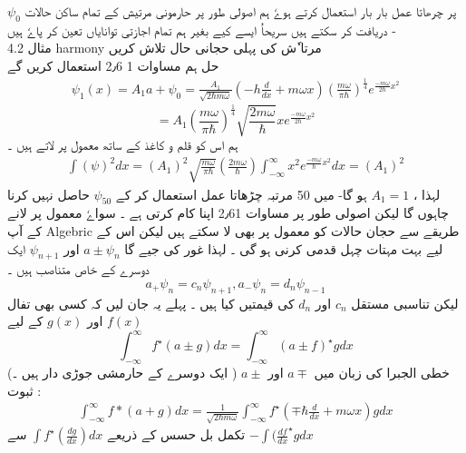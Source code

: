 $ \psi_0 $
پر چرھاتا عمل بار بار استعمال کرتے ہوےٗ ہم اصولی طور پر حارمونی مرتیش کے تمام ساکن حالات دریافت کر سکتے ہیں 
\newpage 
سریحاُ ایسے کیے بغیر ہم تمام  اجازتی توانایاں تعین کر پاےٗ ہیں -
\\
مثال 4.2
harmony مرتا ٗش کی پہلی حجانی حال تلاش کریں 
\\
حل ہم مساوات 1 2٫6 استعمال کریں گے 
\begin{align}
\psi_1 (x) = A_1 a + \psi_0 = \frac{ A_1 }{ \sqrt{ 2 \hbar m \omega } } ( - h \frac{d}{dx} + m \omega x) ( \frac{ m \omega}{ \pi \hbar} )^\frac{1}{4}    e^{\frac{ - m \omega }{ 2 \hbar } x^2}
\end{align}
\begin{equation}
 = A_1 ( \frac{ m \omega }{ \pi \hbar})^\frac{1}{4} \sqrt{ \frac{ 2 m \omega }{ \hbar} } x e^{\frac{ - m \omega }{ 2 \hbar } x^2}
\end{equation}
ہم اس کو قلم و کاغذ کے ساتھ  معمول پر لاتے ہیں ۔ 
\begin{align}
\int{ ( \psi )^2 dx} = ( A_1 )^2 \sqrt{ \frac{ m \omega}{ \pi \hbar } } ( \frac{ 2 m \omega }{ \hbar} ) \int_{ - \infty }^{ \infty } x^2  e^{\frac{ - m \omega }{ \hbar } x^2}  dx  =  ( A_1)^2
\end{align} 
لہذا ، 
$ A_1 = 1 $
ہو گا- 
میں 50 مرتبہ چڑھاتا عمل استعمال کر کے 
$ \psi_50 $ 
 حاصل نہیں کرنا چاہوں گا لیکن  اصولی طور پر مساوات 2٫61 اپنا کام کرتی ہے ۔ سواےٗ معمول پر لانے کے  آپ Algebric طریقے سے حجان حالات کو معمول پر بھی لا سکتے ہیں لیکن اس کے لیے بہت مہتات چہل قدمی کرنی ہو گی ۔ لہذا غور کی جیے گا
$ a \pm \psi_n $
اور
$  \psi_{n+1} $
 ایک دوسرے کے خاص متناصب ہیں ۔ 
\begin{equation} 
a_+ \psi_n = c_n  \psi_{n+1}  ,  a_- \psi_n = d_n \psi_{n-1}
\end{equation} 
لیکن تناسبی مستقل 
$ c_n $
اور 
$ d_n $
کی قیمتیں کیا ہیں ۔  پہلے یہ جان لیں کہ کسی بھی تفال 
$ f (x) $
اور 
$ g(x) $
کے لیے 
\begin{equation}
\int_{ - \infty }^{ \infty } f^\star( a \pm g ) dx = \int_{ - \infty }^{ \infty } ( a \pm f)^\star g dx
\end{equation}
خطی الجبرا کی زبان میں 
$ a \mp $
اور
$ a \pm $ 
( ایک دوسرے کے حارمشی جوڑی دار ہیں ۔)
ثبوت :
\begin{align}
\int_{ - \infty}^{ \infty } f*( a+g ) dx = \frac{1}{ \sqrt{ 2 \hbar m \omega } } \int_{ - \infty }^{ \infty } f^\star( \mp \hbar \frac{ d}{dx} + m \omega x ) g dx
\end{align}
تکمل بل حسس کے ذریعے 
$ \int f^\star( \frac{ dg }{ dx }) dx $
  سے 
$ -\int ( \frac{ df }{ dx }^\star g dx $
